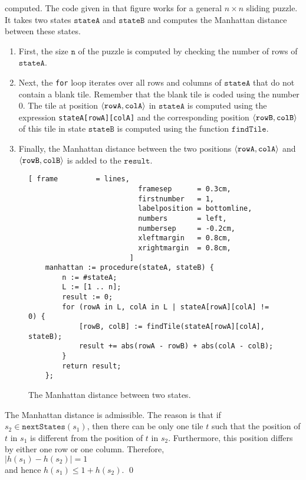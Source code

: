 \begin{enumerate}
      computed.  The code given in that figure works for a general $n \times n$ sliding puzzle.  It takes two
      states $\mathtt{stateA}$ and $\mathtt{stateB}$ and computes the Manhattan distance between these states.
      \begin{enumerate}
      \item First, the size $\mathtt{n}$ of the puzzle is computed by checking the number of rows of
            $\mathtt{stateA}$.
      \item Next, the \texttt{for} loop iterates over all rows and columns of $\mathtt{stateA}$ that do not 
            contain a blank tile.  Remember that the blank tile is coded using the number $0$.  The tile at
            position $\pair(\mathtt{rowA}, \mathtt{colA})$ in $\mathtt{stateA}$ is computed using the expression \texttt{stateA[rowA][colA]} and the
            corresponding position $\pair(\mathtt{rowB}, \mathtt{colB})$ of this tile in state $\mathtt{stateB}$ is computed using the function
            $\mathtt{findTile}$.
      \item Finally, the Manhattan distance between the two positions $\pair(\mathtt{rowA}, \mathtt{colA})$ and
            $\pair(\mathtt{rowB}, \mathtt{colB})$ is added to the $\mathtt{result}$.
      \end{enumerate}

      \begin{figure}[!ht]
        \centering
        \begin{Verbatim}[ frame         = lines, 
                          framesep      = 0.3cm, 
                          firstnumber   = 1,
                          labelposition = bottomline,
                          numbers       = left,
                          numbersep     = -0.2cm,
                          xleftmargin   = 0.8cm,
                          xrightmargin  = 0.8cm,
                        ]
    manhattan := procedure(stateA, stateB) {
        n := #stateA;
        L := [1 .. n];
        result := 0;
        for (rowA in L, colA in L | stateA[rowA][colA] != 0) {
            [rowB, colB] := findTile(stateA[rowA][colA], stateB);
            result += abs(rowA - rowB) + abs(colA - colB);
        }
        return result;
    };
    \end{Verbatim}
    \vspace*{-0.3cm}
    \caption{The Manhattan distance between two states.}
    \label{fig:manhattan.stlx}
    \end{figure}
    
    The Manhattan distance is admissible.  The reason is that if $s_2 \in \mathtt{nextStates}(s_1)$,
    then there can be only one tile $t$ such that the position of $t$ in $s_1$ is different from the position
    of $t$ in $s_2$.  Furthermore, this position differs by either one row or one column.  Therefore,
    \\[0.2cm]
    \hspace*{1.3cm}
    $|h(s_1) - h(s_2)| = 1$
    \\[0.2cm]
    and hence $h(s_1) \leq 1 + h(s_2)$.  \qed
\end{enumerate}
